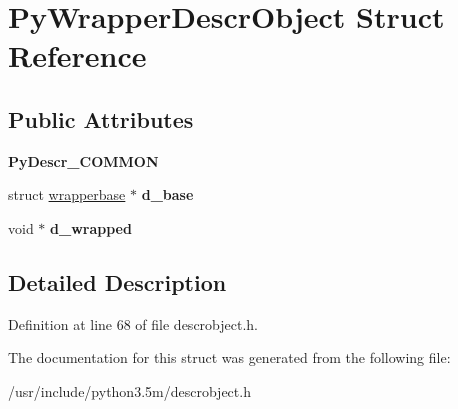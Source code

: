 \hypertarget{structPyWrapperDescrObject}{}\section{Py\+Wrapper\+Descr\+Object Struct Reference}
\label{structPyWrapperDescrObject}
\subsection*{Public Attributes}
\begin{DoxyCompactItemize}
\item 
{\bfseries Py\+Descr\+\_\+\+C\+O\+M\+M\+ON}\hypertarget{structPyWrapperDescrObject_af009d6c8b2a67ec479a9dea3db47e59b}{}\label{structPyWrapperDescrObject_af009d6c8b2a67ec479a9dea3db47e59b}

\item 
struct \hyperlink{structwrapperbase}{wrapperbase} $\ast$ {\bfseries d\+\_\+base}\hypertarget{structPyWrapperDescrObject_a519791b757bde55de79e71995921a55f}{}\label{structPyWrapperDescrObject_a519791b757bde55de79e71995921a55f}

\item 
void $\ast$ {\bfseries d\+\_\+wrapped}\hypertarget{structPyWrapperDescrObject_a7cd533134c75902cc81d4a92631b5f5b}{}\label{structPyWrapperDescrObject_a7cd533134c75902cc81d4a92631b5f5b}

\end{DoxyCompactItemize}


\subsection{Detailed Description}


Definition at line 68 of file descrobject.\+h.



The documentation for this struct was generated from the following file\+:\begin{DoxyCompactItemize}
\item 
/usr/include/python3.\+5m/descrobject.\+h\end{DoxyCompactItemize}
